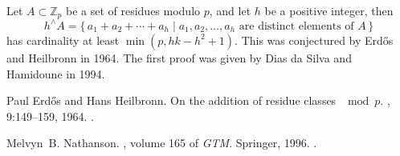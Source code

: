 \documentclass[12pt]{article}
\newcommand*{\integers}{\ensuremath{{\mathbb{Z}}}}
\begin{document}
Let $A\subset \integers_p$ be a set of residues modulo $p$, and let $h$ be a positive integer, then
\begin{equation*}
h^\wedge\!A=\{\,a_1+a_2+\dotsb+a_h \mid a_1,a_2,\dotsc,a_h\text{ are distinct elements of }A\,\}
\end{equation*}
has cardinality at least $\min(p,hk-h^2+1)$. This was conjectured by Erd\H{o}s and Heilbronn in 1964\cite{cite:erdos_heilbronn_conj}. The first proof was given by Dias da Silva and Hamidoune in 1994.

\begin{thebibliography}{1}

Paul Erd{\H{o}}s and Hans Heilbronn.
\newblock On the addition of residue classes $\mod p$.
, 9:149--159, 1964.
\newblock {}.

Melvyn~B. Nathanson.
, volume 165 of {\em GTM}.
\newblock Springer, 1996.
\newblock {}.

\end{thebibliography}

%
\end{document}
